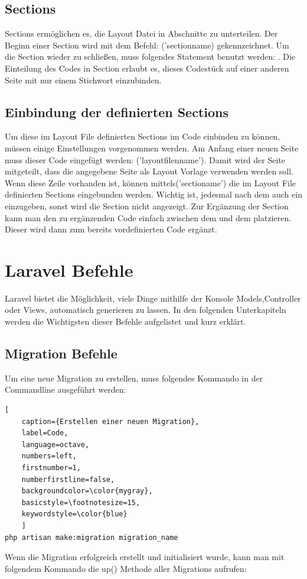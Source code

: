 \subsection{Sections}
Sections ermöglichen es, die Layout Datei in Abschnitte zu unterteilen. Der Beginn einer Section wird mit dem Befehl: \@section('sectionname) gekennzeichnet. Um die Section wieder zu schließen, muss folgendes Statement benutzt werden: \@endsection. Die Einteilung des Codes in Section erlaubt es, dieses Codestück auf einer anderen Seite mit nur einem Stichwort einzubinden. 
\subsection{Einbindung der definierten Sections}
Um diese im Layout File definierten Sections im Code einbinden zu können, müssen einige Einstellungen vorgenommen werden. Am Anfang einer neuen Seite muss dieser Code eingefügt werden: \@extends('layoutfilenname'). Damit wird der Seite mitgeteilt, dass die angegebene Seite als Layout Vorlage verwenden werden soll. Wenn diese Zeile vorhanden ist, können mittels\@section('sectioname') die im Layout File definierten Sections eingebunden werden. Wichtig ist,  jedesmal nach dem \@section auch ein \@endsection einzugeben, sonst wird die Section nicht angezeigt. Zur Ergänzung der Section kann man den zu ergänzenden Code einfach zwischen dem \@section und dem \@endsection platzieren. Dieser wird dann zum bereits vordefinierten Code ergänzt.

\section{Laravel Befehle}
Laravel bietet die Möglichkeit, viele Dinge mithilfe der Konsole Models,Controller oder Views, automatisch generieren zu lassen. In den folgenden Unterkapiteln werden die Wichtigsten dieser Befehle aufgelistet und kurz erklärt.
\subsection{Migration Befehle}
Um eine neue Migration zu erstellen, muss folgendes Kommando in der Commandline ausgeführt werden:
\renewcommand{\lstlistingname}{Quellcode}

\begin{lstlisting}[
	caption={Erstellen einer neuen Migration},
	label=Code,
	language=octave,
	numbers=left,
	firstnumber=1,
	numberfirstline=false,
	backgroundcolor=\color{mygray},
	basicstyle=\footnotesize=15,
	keywordstyle=\color{blue}
	]
php artisan make:migration migration_name
\end{lstlisting}
Wenn die Migration erfolgreich erstellt und initialisiert wurde, kann man mit folgendem Kommando die up() Methode aller Migrations aufrufen:
\renewcommand{\lstlistingname}{Quellcode}

